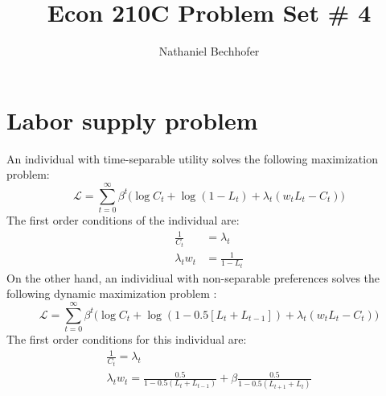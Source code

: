 \documentclass[11pt]{amsart}
\title{Econ 210C Problem Set \# 4}
\author{Nathaniel Bechhofer}
\begin{document}
\maketitle

\section{Labor supply problem}
An individual with time-separable utility solves the following maximization problem: 
\begin{equation*}
\mathcal{L} = \sum_{t=0}^{\infty} \beta^t \bigg( \log C_t + \log (1-L_t)  + \lambda_t  \left(  w_t L_t - C_t \right) \bigg)
\end{equation*}
The first order conditions of the individual are: 
\begin{align*}
\frac{1}{C_t} &= \lambda_t  \\
\lambda_t w_t &= \frac{1}{1-L_t} 
\end{align*}
On the other hand, an individiual with non-separable preferences solves the following dynamic maximization problem :
\begin{equation*}
\mathcal{L} = \sum_{t=0}^{\infty} \beta^t \bigg( \log C_t + \log\left( 1 - 0.5 \left[ L_t + L_{t-1} \right] \right) + \lambda_t  \left(  w_t L_t - C_t \right)  \bigg)
\end{equation*}
The first order conditions for this individual are: 
\begin{gather*}
\frac{1}{C_t} = \lambda_t  \\
\lambda_t w_t = \frac{0.5}{1 - 0.5 \left( L_t + L_{t-1} \right)} + \beta \frac{0.5}{1 - 0.5 \left( L_{t+1} + L_t \right)}
\end{gather*}
\end{document}
